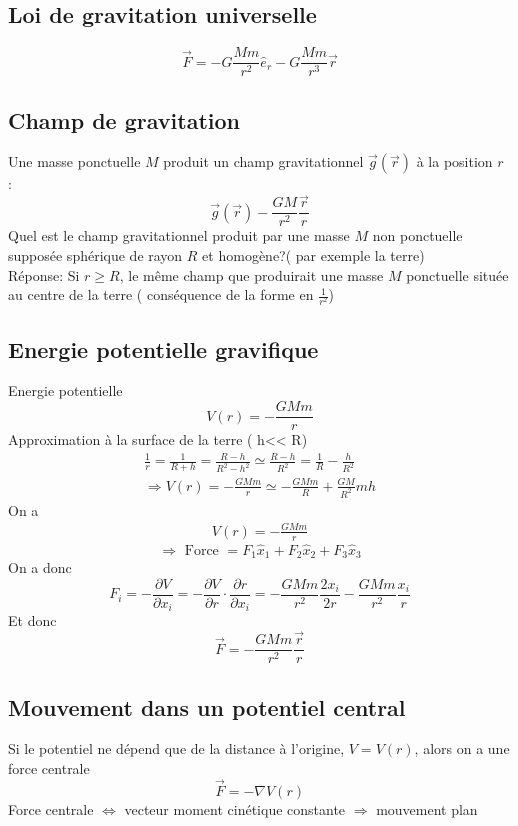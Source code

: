 \documentclass[../main.tex]{subfiles}
\begin{document}
\subsection{Loi de gravitation universelle}
\begin{thm}\label{thm:gravitation_universelle}
	\[ 
	\vec{F}= - G \frac{Mm}{r^{2}}\hat{e}_r - G \frac{Mm}{r^{3}} \vec{r}
	\]
	
\end{thm}


\subsection{Champ de gravitation}
Une masse ponctuelle $M$ produit un champ gravitationnel $\vec{g}( \vec{r}) $ à la position $r$ :
\[ 
	\vec{g}( \vec{r}) - \frac{GM}{r^{2}}\frac{\vec{r}}{r}
\]
Quel est le champ gravitationnel produit par une masse $M$ non ponctuelle supposée sphérique de rayon $R$ et homogène?( par exemple la terre) \\
Réponse: Si $r\geq R$, le même champ que produirait une masse $M$ ponctuelle située au centre de la terre ( conséquence de la forme en $\frac{1}{r^{2}}$)
\subsection{Energie potentielle gravifique}
Energie potentielle
\[ 
	V( r)  = - \frac{GMm}{r}
\]
Approximation à la surface de la terre ( h<< R) 
\begin{align*}
\frac{1}{r} = \frac{1}{R+h} = \frac{R-h}{R^{2}-h^{2}}\simeq \frac{R-h}{R^{2}}=\frac{1}{R} - \frac{h}{R^{2}}\\
\Rightarrow V( r) = - \frac{GMm}{r} \simeq - \frac{GMm}{R} + \frac{GM}{R^{2}}mh
\end{align*}
On a 
\begin{align*}
	V( r) = - \frac{GMm}{r}
\end{align*}
\[ 
\Rightarrow \text{ Force } = F_1\hat{x}_1 + F_2 \hat{x}_2 + F_3 \hat{x}_3
\]
On a donc
\[ 
F_i = - \frac{\partial V}{\partial x_i} = - \frac{\partial V}{\partial r}\cdot \frac{\partial r}{\partial x_i} = - \frac{GMm}{r^{2}} \frac{2 x_i}{2r} - \frac{GMm}{r^{2}} \frac{x_i}{r}
\]
Et donc
\[ 
	\vec{F} = - \frac{GMm}{r^{2}} \frac{\vec{r}}{r}
\]
\subsection{Mouvement dans un potentiel central}
Si le potentiel ne dépend que de la distance à l'origine, $V= V( r) $, alors on a une force centrale
\[ 
	\vec{F} = - \nabla V( r) 
\]
Force centrale $\iff$ vecteur moment cinétique constante $\Rightarrow$ mouvement plan
\end{document}
